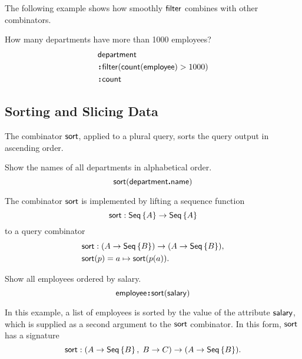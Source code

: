The following example shows how smoothly $\textup{\textsf{filter}}$ combines with other
combinators.

\begin{demo}
    \label{ex:filter-by-size-and-count}
    How many departments have more than 1000 employees?
    \begin{align*}
        & \textup{\textsf{department}} \\
        & \!\boldsymbol{:}\!\textup{\textsf{filter}}(\textup{\textsf{count}}(\textup{\textsf{employee}})>1000) \\
        & \!\boldsymbol{:}\!\textup{\textsf{count}}
    \end{align*}
\end{demo}

\subsection*{Sorting and Slicing Data}

The combinator $\textup{\textsf{sort}}$, applied to a plural query, sorts the query output in
ascending order.

\begin{demo}
    \label{ex:sort-department-name}
    Show the names of all departments in alphabetical order.
    \begin{equation*}
        \textup{\textsf{sort}}(\textup{\textsf{department}}\boldsymbol{.}\textup{\textsf{name}})
    \end{equation*}
\end{demo}

The combinator $\textup{\textsf{sort}}$ is implemented by lifting a sequence function
\begin{equation*}
    \textup{\textsf{sort}} : \textup{\textsf{Seq}}\left\{A\right\} \to \textup{\textsf{Seq}}\left\{A\right\}
\end{equation*}
to a query combinator
\begin{align*}
    & \textup{\textsf{sort}} : (A \to \textup{\textsf{Seq}}\left\{B\right\}) \to (A \to \textup{\textsf{Seq}}\left\{B\right\}), \\
    & \textup{\textsf{sort}}(p) = a \mapsto \textup{\textsf{sort}}(p(a)).
\end{align*}

\begin{demo}
    \label{ex:sort-employee-by-salary}
    Show all employees ordered by salary.
    \begin{equation*}
        \textup{\textsf{employee}}\!\boldsymbol{:}\!\textup{\textsf{sort}}(\textup{\textsf{salary}})
    \end{equation*}
\end{demo}

In this example, a list of employees is sorted by the value of the attribute
$\textup{\textsf{salary}}$, which is supplied as a second argument to the $\textup{\textsf{sort}}$ combinator.
In this form, $\textup{\textsf{sort}}$ has a signature
\begin{equation*}
    \textup{\textsf{sort}} : (A \to \textup{\textsf{Seq}}\left\{B\right\},\; B \to C) \to (A \to \textup{\textsf{Seq}}\left\{B\right\}).
\end{equation*}

